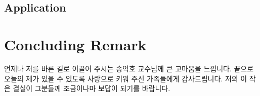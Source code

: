 \documentclass[master,english,draft,pdfdoc]{kaist-ucs}
\begin{document}


\section{Application}



\chapter{Concluding Remark}








\acknowledgment[4]
    언제나 저를 바른 길로 이끌어 주시는 송익호 교수님께 큰 고마움을 느낍니다.
    끝으로 오늘의 제가 있을 수 있도록 사랑으로 키워 주신 가족들에게 감사드립니다.
    저의 이 작은 결실이 그분들께 조금이나마 보답이 되기를 바랍니다.

\curriculumvitae[4]

    \begin{personaldata}
        \address    {대전광역시}
    \end{personaldata}
\end{document}
